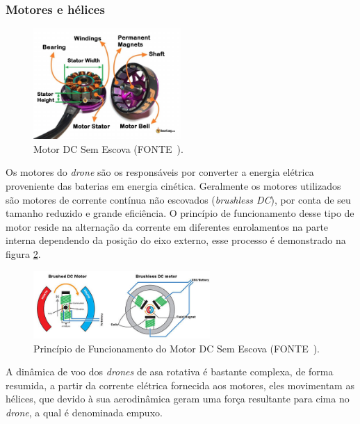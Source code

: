 \documentclass[12pt,a4paper,oneside]{book}
\begin{document}
\subsubsection*{Motores e hélices}
%
\begin{figure}[H]
  \centering
  \includegraphics[width=0.5\textwidth]{Images/introducao/brushlessmotor.jpg}
  \caption{Motor DC Sem Escova (FONTE~\cite{url:brushless}).}
  \label{fig:brushlessmotor.jpg.0}
\end{figure}
%
Os motores do \textit{drone} são os responsáveis por converter a energia elétrica proveniente das baterias em energia cinética. Geralmente os 
motores utilizados são motores de corrente contínua não escovados (\textit{brushless DC}), por conta de seu tamanho reduzido e grande eficiência. O princípio de funcionamento desse tipo de motor reside na alternação da corrente em diferentes enrolamentos na parte interna dependendo da posição do eixo externo, esse processo é demonstrado na figura \ref{fig:brushlessscheme.jpg.0}. 
%
\begin{figure}[H]
  \centering
  \includegraphics[width=0.6\textwidth]{Images/introducao/brushlessscheme.jpg}
  \caption{Princípio de Funcionamento do Motor DC Sem Escova (FONTE~\cite{url:brushlessscheme}).}
  \label{fig:brushlessscheme.jpg.0}
\end{figure}
%
A dinâmica de voo dos \textit{drones} de asa rotativa é bastante complexa, de forma resumida, a partir da corrente elétrica fornecida aos motores, eles movimentam as hélices, que devido à sua aerodinâmica geram uma força resultante para cima no \textit{drone}, a qual é denominada empuxo.  
\end{document}
